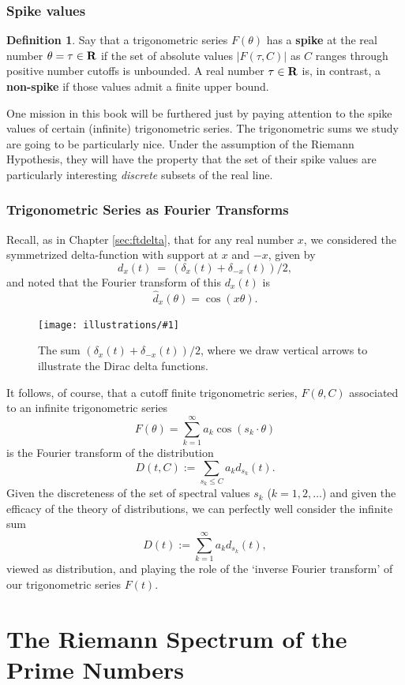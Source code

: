 \documentclass[openany]{book}
\newcommand{\ill}[3]{%
   \begin{figure}[H]%
   \vspace{-2ex}
   \centering%
   \texttt{[image: illustrations/\#1]}%
   \caption{#3}%
   \vspace{-2ex}
    \end{figure}}
\theoremstyle{plain}
\theoremstyle{definition}
\newtheorem{definition}[theorem]{Definition}
\begin{document}
\section{\bf Spike values} \begin{definition} Say
  that a trigonometric series $F(\theta)$ has a {\bf spike} at the real number $\theta=\tau \in {\bf R}$
if the set of absolute values $|F(\tau,C)|$  as $C$ ranges through positive number cutoffs is
  unbounded.  A real number $\tau \in {\bf R}$ is, in contrast, a {\bf
    non-spike} if those values admit a finite upper
  bound. \end{definition}

   One mission in this book will be furthered just by paying attention to the  spike values of certain (infinite) trigonometric series.
    The trigonometric sums we study are
  going to be particularly nice. Under the assumption of the Riemann
  Hypothesis, they  will have the
  property that the set of their spike values are particularly interesting {\it discrete}
  subsets of the real line.

\section{Trigonometric Series as Fourier Transforms}


Recall, as in Chapter \ref{sec:ftdelta}, that for any real number $x$, we considered
the symmetrized delta-function with support at $x$ and $-x$, given
by
$$
 d_x(t) \ = \ (\delta_x(t) + \delta_{-x}(t))/2,
$$
and noted that the Fourier transform of this $d_x(t)$  is
$$
   \label{dx2}{\hat d_x}(\theta)  = \cos(x\theta).
$$
\ill{two_delta}{0.4}{The sum $(\delta_x(t) + \delta_{-x}(t))/2$,
where we draw vertical arrows to illustrate the Dirac delta functions.}

It follows, of course, that a cutoff finite trigonometric series,
$F(\theta,C)$ associated to an infinite trigonometric series
$$
 F(\theta) = \sum_{k=1}^{\infty} a_k\cos(s_k\cdot \theta)
$$
is the Fourier transform of the distribution
$$
 D(t,C):=\sum_{s_k \le C}a_kd_{s_k}(t).
$$
Given the discreteness of the set of spectral values $s_k$ ($k=1,2,\dots$)  and
given the efficacy of  the theory of distributions, we can perfectly well
consider the infinite sum
$$
 D(t):=\sum_{k=1}^{\infty}a_kd_{s_k}(t),
$$ viewed as distribution, and playing the role of
the `inverse Fourier transform' of our trigonometric
series $F(t)$.


\part{The Riemann Spectrum of the Prime Numbers\label{part3}}
\end{document}
